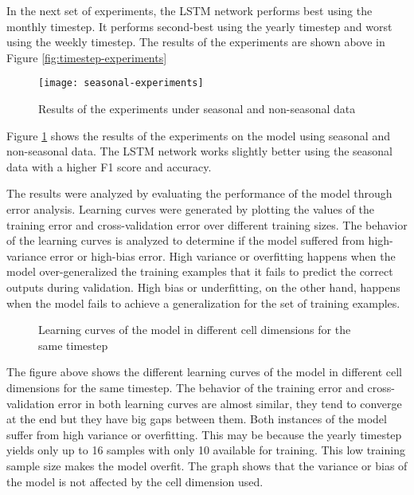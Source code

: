 \documentclass[a0]{sciposter}
\begin{document}
\begin{multicols}{2}
    In the next set of experiments, the LSTM network performs best using the monthly timestep. It performs second-best using the yearly timestep and worst using the weekly timestep. The results of the experiments are shown above in Figure \ref{fig:timestep-experiments}

    \begin{figure}[ht]
    \centering
    \texttt{[image: seasonal-experiments]}
    \caption{Results of  the experiments under seasonal and non-seasonal data}
    \label{fig:seasonal-experiments}
    \end{figure}

    Figure \ref{fig:seasonal-experiments} shows the results of the experiments on the model using seasonal and non-seasonal data. The LSTM network works slightly better using the seasonal data with a higher F1 score and accuracy.

    The results were analyzed by evaluating the performance of the model through error analysis. Learning curves were generated by plotting the values of the training error and cross-validation error over different training sizes. The behavior of the learning curves is analyzed to determine if the model suffered from high-variance error or high-bias error. High variance or overfitting happens when the model over-generalized the training examples that it fails to predict the correct outputs during validation. High bias or underfitting, on the other hand, happens when the model fails to achieve a generalization for the set of training examples.

    \begin{figure}
    \label{fig:dimension-learning-curve}
    \centering
    \caption{Learning curves of the model in different cell dimensions for the same timestep}
    \end{figure}

    The figure above shows the different learning curves of the model in different cell dimensions for the same timestep. The behavior of the training error and cross-validation error in both learning curves are almost similar, they tend to converge at the end but they have big gaps between them. Both instances of the model suffer from high variance or overfitting. This may be because the yearly timestep yields only up to 16 samples with only 10 available for training. This low training sample size makes the model overfit. The graph shows that the variance or bias of the model is not affected by the cell dimension used.


\end{multicols}
\end{document}
